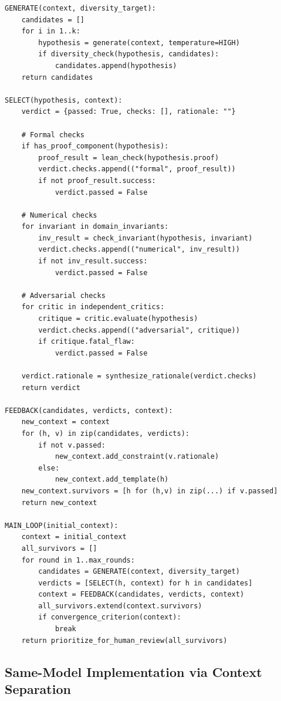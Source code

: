 \documentclass[11pt]{article}
\begin{document}
\begin{verbatim}
GENERATE(context, diversity_target):
    candidates = []
    for i in 1..k:
        hypothesis = generate(context, temperature=HIGH)
        if diversity_check(hypothesis, candidates):
            candidates.append(hypothesis)
    return candidates

SELECT(hypothesis, context):
    verdict = {passed: True, checks: [], rationale: ""}

    # Formal checks
    if has_proof_component(hypothesis):
        proof_result = lean_check(hypothesis.proof)
        verdict.checks.append(("formal", proof_result))
        if not proof_result.success:
            verdict.passed = False

    # Numerical checks
    for invariant in domain_invariants:
        inv_result = check_invariant(hypothesis, invariant)
        verdict.checks.append(("numerical", inv_result))
        if not inv_result.success:
            verdict.passed = False

    # Adversarial checks
    for critic in independent_critics:
        critique = critic.evaluate(hypothesis)
        verdict.checks.append(("adversarial", critique))
        if critique.fatal_flaw:
            verdict.passed = False

    verdict.rationale = synthesize_rationale(verdict.checks)
    return verdict

FEEDBACK(candidates, verdicts, context):
    new_context = context
    for (h, v) in zip(candidates, verdicts):
        if not v.passed:
            new_context.add_constraint(v.rationale)
        else:
            new_context.add_template(h)
    new_context.survivors = [h for (h,v) in zip(...) if v.passed]
    return new_context

MAIN_LOOP(initial_context):
    context = initial_context
    all_survivors = []
    for round in 1..max_rounds:
        candidates = GENERATE(context, diversity_target)
        verdicts = [SELECT(h, context) for h in candidates]
        context = FEEDBACK(candidates, verdicts, context)
        all_survivors.extend(context.survivors)
        if convergence_criterion(context):
            break
    return prioritize_for_human_review(all_survivors)
\end{verbatim}

\subsection{Same-Model Implementation via Context Separation}
\end{document}
